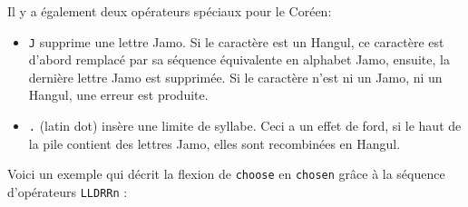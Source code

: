 \noindent Il y a également deux opérateurs spéciaux pour le  Coréen:
\begin{itemize}
\item \verb+J+ supprime une lettre Jamo. Si le caractère est un Hangul, ce caractère est d'abord
remplacé par sa séquence équivalente en alphabet Jamo, ensuite, la dernière lettre Jamo est
supprimée. Si le caractère n'est ni un Jamo, ni un Hangul, une erreur est produite.
\item \verb+.+ (latin dot) insère une limite de syllabe. Ceci a un effet de ford, si le haut de la
	pile contient des lettres Jamo, elles sont recombinées en Hangul.
\end{itemize}


\bigskip
\noindent Voici un exemple qui décrit la flexion de \verb+choose+ en \verb+chosen+
      grâce à la séquence d’opérateurs \verb+LLDRRn+ :
